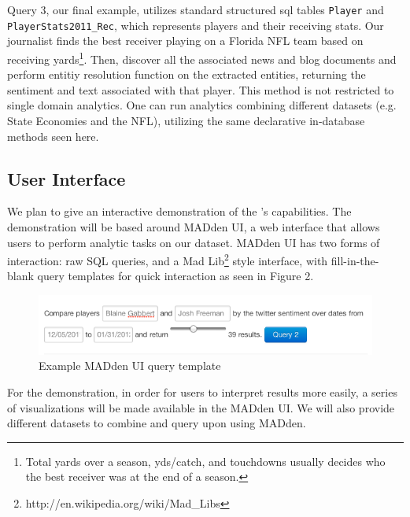 {Query 3, our final example, utilizes standard structured sql tables {\tt Player}
and {\tt PlayerStats2011\_Rec}, which represents players and their receiving
stats. Our journalist finds the best receiver playing on a Florida NFL team
based on receiving yards\footnote{Total yards over a season, yds/catch, and
touchdowns usually decides who the best receiver was at the end of a season.}.
Then, discover all the associated news and blog documents and perform entitiy
resolution function on the extracted entities, returning the sentiment and text
associated with that player. This method is not restricted to single domain
analytics. One can run analytics combining different datasets (e.g. State
Economies and the NFL), utilizing the same declarative in-database methods seen
here.
} %


\subsection{User Interface}

We plan to give an interactive demonstration of the 
{\system}'s capabilities. The demonstration will be based around MADden UI,
a web interface that allows users to perform analytic tasks on our dataset.
MADden UI has two forms of interaction: raw SQL queries, and a Mad
Lib\footnote{http://en.wikipedia.org/wiki/Mad\_Libs} style interface, with
fill-in-the-blank query templates for quick interaction as seen in Figure
2.

\begin{figure}
\begin{center}
	\includegraphics[scale=.43]{content/graphics/example_madlib.png}
\end{center}
\caption{Example MADden UI query template} 
\label{fig:madlib}
\end{figure}

For the demonstration, in order for users to interpret results more 
easily, a series of
visualizations will be made available in the MADden UI. We will also provide
different datasets to combine and query upon using MADden.


